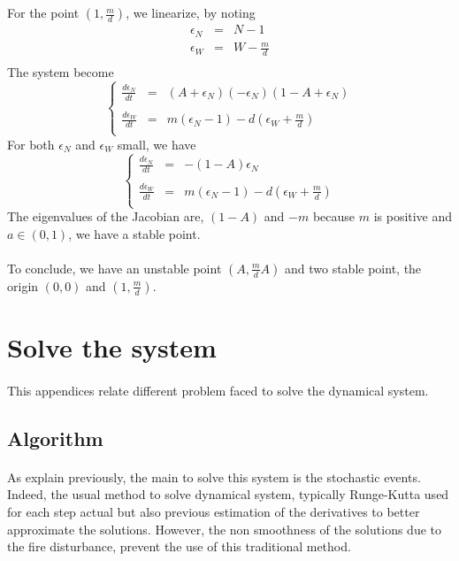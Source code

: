 \documentclass{article}
\begin{document}
\\
\\
For the point $(1,\frac{m}{d})$, we linearize, by noting 
\[
\begin{array}{rcl}
\epsilon_N & = & N - 1 \\
\epsilon_W & = & W - \frac{m}{d} \\
\end{array}
\]
The system become
\[
\left\lbrace
\begin{array}{rcl}
\frac{d\epsilon_N}{dt} & = & (A+\epsilon_N)(-\epsilon_N)(1-A+\epsilon_N) \\
\\
\frac{d\epsilon_W}{dt} & = & m(\epsilon_N-1) -d(\epsilon_W+\frac{m}{d}) \\
\end{array}
\right.
\]
For both $\epsilon_N$ and $\epsilon_W$ small, we have
\[
\left\lbrace
\begin{array}{rcl}
\frac{d\epsilon_N}{dt} & = & -(1-A)\epsilon_N \\
\\
\frac{d\epsilon_W}{dt} & = & m(\epsilon_N-1) -d(\epsilon_W+\frac{m}{d}) \\
\end{array}
\right.
\]
The eigenvalues of the Jacobian are, $(1-A)$ and $-m$ because $m$ is positive and $a\in(0,1)$, we have a stable point.


\paragraph{}
To conclude, we have an unstable point $(A, \frac{m}{d}A)$ and two stable point, the origin $(0,0)$ and $(1, \frac{m}{d})$.


\newpage
\section{Solve the system}

\label{technicality}

\paragraph{}
This appendices relate different problem faced to solve the dynamical system.


\subsection{Algorithm}

\paragraph{}
As explain previously, the main to solve this system is the stochastic events. Indeed, the usual method to solve dynamical system, typically Runge-Kutta \citep{butcher1964implicit} used for each step actual but also previous estimation of the derivatives to better approximate the solutions. However, the non smoothness of the solutions due to the fire disturbance, prevent the use of this traditional method.
\end{document}
